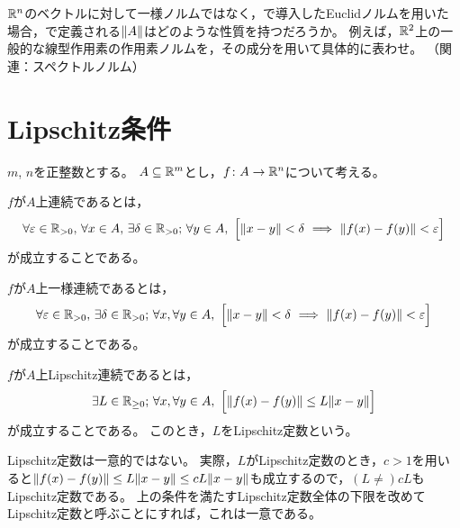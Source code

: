 \documentclass[b5paper,draft,oneside,openany]{ltjsbook} %
\begin{document}
\begin{prob}
    $\mathbb{R}^n$のベクトルに対して一様ノルムではなく，で導入したEuclidノルムを用いた場合，で定義される$\norm{A}$はどのような性質を持つだろうか。
    例えば，$\mathbb{R}^2$上の一般的な線型作用素の作用素ノルムを，その成分を用いて具体的に表わせ。
    （関連：スペクトルノルム）
\end{prob}


\section{Lipschitz条件}
$m$, $n$を正整数とする。
$A\subseteq \mathbb{R}^m$とし，$f\colon A\to \mathbb{R}^n$について考える。

\begin{defi}[連続性]
    $f$が$A$上連続であるとは，
    \begin{equation}
        \forall \varepsilon\in\Rposi,\, \forall x\in A,\, \exists \delta \in \Rposi;\, \forall y \in A,\ \bsqu{
            \norm{x-y}<\delta \ \Longrightarrow\ \norm{\fun{f}{x}-\fun{f}{y}}<\varepsilon
        }
    \end{equation}
    が成立することである。
\end{defi}

\begin{defi}[一様連続性]
    $f$が$A$上一様連続であるとは，
    \begin{equation}
        \forall \varepsilon\in\Rposi,\, \exists \delta \in \Rposi;\,  \forall x, \forall y \in A,\ \bsqu{
            \norm{x-y}<\delta \ \Longrightarrow\ \norm{\fun{f}{x}-\fun{f}{y}}<\varepsilon
        }
    \end{equation}
    が成立することである。
\end{defi}

\begin{defi}[Lipschitz連続]
    $f$が$A$上Lipschitz連続であるとは，
    \begin{equation}
        \exists L\in \Rnonnega;\, \forall x, \forall y \in A,\ \bsqu{
            \norm{\fun{f}{x}-\fun{f}{y}}\leq L \norm{x - y}
        }
    \end{equation}
    が成立することである。
    このとき，$L$をLipschitz定数という。
\end{defi}

\begin{rem}
    Lipschitz定数は一意的ではない。
    実際，$L$がLipschitz定数のとき，$c>1$を用いると$\norm{\fun{f}{x}-\fun{f}{y}}\leq L \norm{x - y}\leq cL \norm{x-y}$も成立するので，$(L\neq )cL$もLipschitz定数である。
    上の条件を満たすLipschitz定数全体の下限を改めてLipschitz定数と呼ぶことにすれば，これは一意である。
\end{rem}
\end{document}
